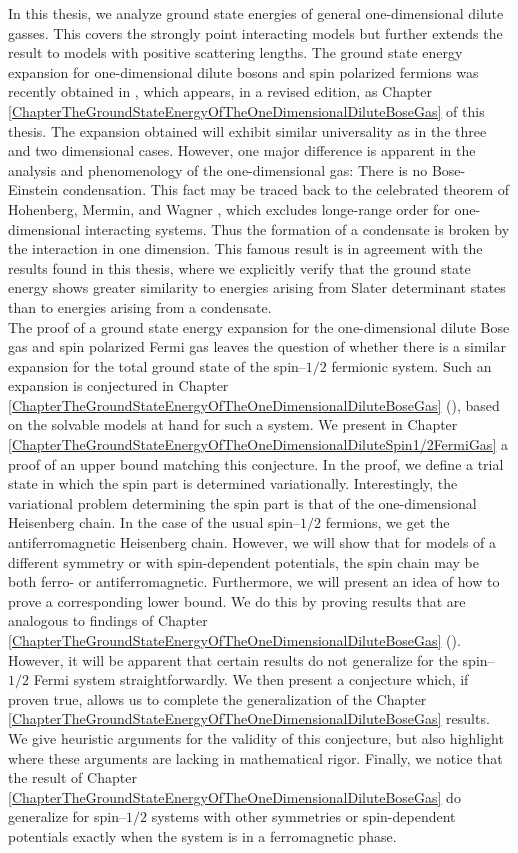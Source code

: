 In this thesis, we analyze ground state energies of general one-dimensional dilute gasses. This covers the strongly point interacting models but further extends the result to models with positive scattering lengths. The ground state energy expansion for one-dimensional dilute bosons and spin polarized fermions was recently obtained in \cite{agerskov2022ground}, which appears, in a revised edition, as Chapter \ref{ChapterTheGroundStateEnergyOfTheOneDimensionalDiluteBoseGas} of this thesis. The expansion obtained will exhibit similar universality as in the three and two dimensional cases. However, one major difference is apparent in the analysis and phenomenology of the one-dimensional gas: There is no Bose-Einstein condensation. This fact may be traced back to the celebrated theorem of Hohenberg, Mermin, and Wagner \cite{hohenberg1967existence,mermin1966absence}, which excludes longe-range order for one-dimensional interacting systems. Thus the formation of a condensate is broken by the interaction in one dimension. This famous result is in agreement with the results found in this thesis, where we explicitly verify that the ground state energy shows greater similarity to energies arising from Slater determinant states than to energies arising from a condensate.\\
The proof of a ground state energy expansion for the one-dimensional dilute Bose gas and spin polarized Fermi gas leaves the question of whether there is a similar expansion for the total ground state of the spin--$ 1/2 $ fermionic system. Such an expansion is conjectured in Chapter \ref{ChapterTheGroundStateEnergyOfTheOneDimensionalDiluteBoseGas} (\cite{agerskov2022ground}), based on the solvable models at hand for such a system. We present in Chapter \ref{ChapterTheGroundStateEnergyOfTheOneDimensionalDiluteSpin1/2FermiGas} a proof of an upper bound matching this conjecture. In the proof, we define a trial state in which the spin part is determined variationally. Interestingly, the variational problem determining the spin part is that of the one-dimensional Heisenberg chain. In the case of the usual spin--$ 1/2 $ fermions, we get the antiferromagnetic Heisenberg chain. However, we will show that for models of a different symmetry or with spin-dependent potentials, the spin chain may be both ferro- or antiferromagnetic. Furthermore, we will present an idea of how to prove a corresponding lower bound. We do this by proving results that are analogous to findings of Chapter \ref{ChapterTheGroundStateEnergyOfTheOneDimensionalDiluteBoseGas} (\cite{agerskov2022ground}). However, it will be apparent that certain results do not generalize for the spin--$ 1/2 $ Fermi system straightforwardly. We then present a conjecture which, if proven true, allows us to complete the generalization of the Chapter \ref{ChapterTheGroundStateEnergyOfTheOneDimensionalDiluteBoseGas} results. We give heuristic arguments for the validity of this conjecture, but also highlight where these arguments are lacking in mathematical rigor. Finally, we notice that the result of Chapter \ref{ChapterTheGroundStateEnergyOfTheOneDimensionalDiluteBoseGas} do generalize for spin--$ 1/2 $ systems with other symmetries or spin-dependent potentials exactly when the system is in a ferromagnetic phase.\\

